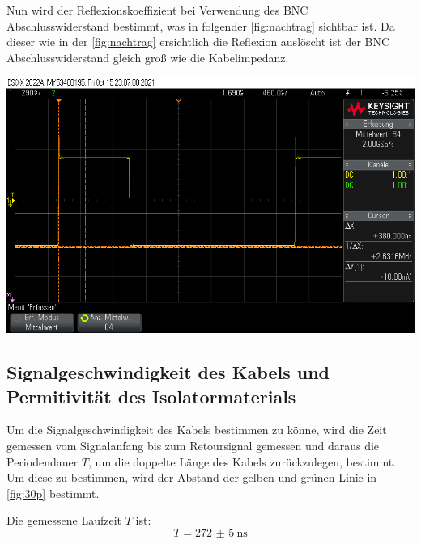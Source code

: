 \documentclass[11pt,ngerman]{scrartcl}
\begin{document}
\noindent Nun wird der Reflexionskoeffizient bei Verwendung des BNC
Abschlusswiderstand bestimmt, was in folgender \autoref{fig:nachtrag} sichtbar
ist. Da dieser wie in der \autoref{fig:nachtrag} ersichtlich die Reflexion
auslöscht ist der BNC Abschlusswiderstand gleich groß wie die Kabelimpedanz.

\begin{center}
	\begin{minipage}[t]{0.7\textwidth}
		\includegraphics[width=\textwidth]{oszi/scope_0_30}
		\label{fig:nachtrag}
	\end{minipage}
\end{center}

\subsection{Signalgeschwindigkeit des Kabels und Permitivität des Isolatormaterials}

Um die Signalgeschwindigkeit des Kabels bestimmen zu könne, wird die Zeit
gemessen vom Signalanfang bis zum Retoursignal gemessen und daraus die
Periodendauer $T$, um die doppelte Länge des Kabels zurückzulegen, bestimmt. Um
diese zu bestimmen, wird der Abstand der gelben und grünen Linie in
\autoref{fig:30p} bestimmt.

\vspace{2mm}

\noindent Die gemessene Laufzeit $T$ ist:
\begin{equation}
	T = \SI{272(5)}{\ns}
	\label{eq:laufzeit}
\end{equation}
\end{document}
